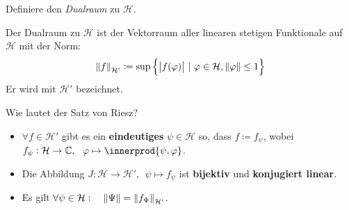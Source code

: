 \documentclass[9pt]{article}
\newcommand{\C}[1]{%
	\ifthenelse{\equal{#1}{}}
	{\mathbb{C}}
	{\mathbb{C}^#1}}%
\newcommand{\Hi}{\mathcal{H}}
\DeclarePairedDelimiter{\innerprod}\langle\rangle
\newenvironment{field}{}{\newpage}
\newif\ifnote
\newenvironment{note}{\notetrue}{\notefalse}
\newcommand{\localtag}{}
\newcommand{\globaltag}{}
\newcommand{\uuid}{}
\newcommand{\tags}[1]{
    \ifnote 
        \renewcommand{\localtag}{#1}
    \else
        \renewcommand{\globaltag}{#1}
    \fi 
    }
\newcommand{\xplain}[1]{\renewcommand{\uuid}{#1}}
\begin{document}
	\begin{note}
		\xplain{UUID}
		\tags{definition, satz, dualraum, 5.2.17, 5.2.18}
		
		\begin{field}  %
			Definiere den \textit{Dualraum} zu $\Hi$.
		\end{field}
		
		\begin{field}  %
			Der Dualraum zu $\Hi$ ist der Vektorraum aller linearen stetigen Funktionale auf $\Hi$
			mit der Norm:
			\begin{equation*}
				\norm{f}_{\Hi'} \coloneqq \sup\qty{\abs{f(\varphi)} \ | \ \varphi \in \Hi, \norm{\varphi}\leq 1}
			\end{equation*}
			Er wird mit $\Hi'$ bezeichnet. 
		\end{field}
		
	\begin{field}  %
		Wie lautet der Satz von Riesz?
	\end{field}
	
	\begin{field}  %
		\begin{itemize}
			\item $\forall f \in \Hi'$ gibt es ein \textbf{eindeutiges} $\psi \in \Hi$ so, dass
			$f \coloneqq f_\psi$, wobei $f_\psi :\Hi \rightarrow \C{}, \ \ \varphi \mapsto \innerprod{\psi,\varphi}$.
			\item Die Abbildung $J : \Hi \rightarrow \Hi', \ \ \psi \mapsto f_\psi$ ist \textbf{bijektiv} und \textbf{konjugiert linear}.
			\item Es gilt $\forall \psi \in \Hi: \quad \norm{\Psi} = \norm{f_\Psi}_{\Hi'}$.
		\end{itemize}
	\end{field}
	\end{note}
\end{document}
